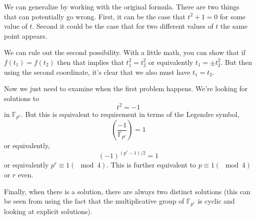 \documentclass{article}
\begin{document}
We can generalize by working with the original formula. There are two things that can potentially go wrong. First, it can be the case that \(t^{2} + 1 = 0\) for some value of \(t\). Second it could be the case that for two different values of \(t\) the same point appears. 

We can rule out the second possibility. With a little math, you can show that if \(f(t_{1}) = f(t_{2})\) then that implies that \(t_{1}^{2} = t_{2}^{2}\) or equivalently \(t_{1} = \pm t_{2}^{2}\). But then using the second coordinate, it's clear that we also must have \(t_{1} = t_{2}\).

Now we just need to examine when the first problem happens. We're looking for solutions to
\begin{equation}
t^{2} = -1
\end{equation}
in \(\mathbb{F}_{p^{r}}\). But this is equivalent to requirement in terms of the Legendre symbol,
\begin{equation}
\left(\frac{-1}{\mathbb{F}_{p^{r}}}\right) = 1
\end{equation}
or equivalently,
\begin{equation}
(-1)^{(p^{r}-1)/2}  = 1
\end{equation}
or equivalently \(p^{r} \equiv 1 (\mod 4)\). This is further equivalent to \(p \equiv 1 (\mod 4)\) or \(r\) even.

Finally, when there is a solution, there are always two distinct solutions (this can be seen from using the fact that the multiplicative group of \(\mathbb{F}_{p^{r}}\) is cyclic and looking at explicit solutions).
\end{document}
